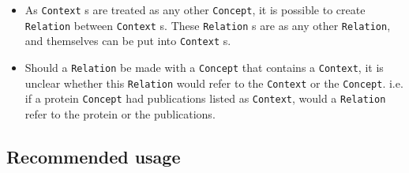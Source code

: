 \documentclass[a4paper,10pt]{article}
\newcommand{\term}[1]{\texttt{#1}\xspace}
\newcommand{\co}{\term{Concept}}
\newcommand{\cxt}{\term{Context}}
\newcommand{\re}{\term{Relation}}
\begin{document}
\begin{itemize}
\item As \cxt s are treated as any other \co , it is possible to create \re between \cxt s. These \re s are as any other \re , and themselves can be put into \cxt s.

\item Should a \re be made with a \co that contains a \cxt , it is unclear whether this \re would refer to the \cxt or the \co . i.e. if a protein \co had publications listed as \cxt , would a \re refer to the protein or the publications.


\end{itemize}



\subsection{Recommended usage}
\end{document}
